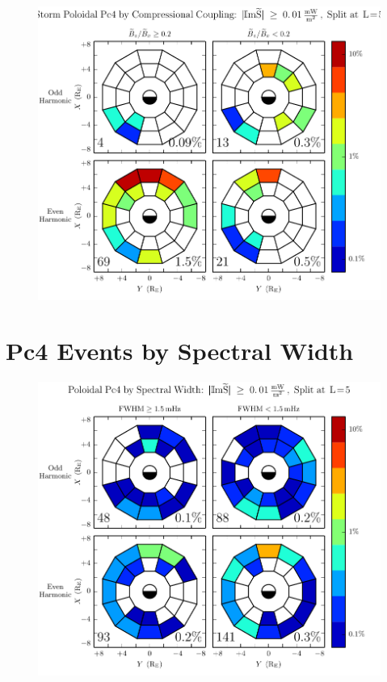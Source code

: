 \begin{figure}[!htb]
    \centering
    \includegraphics[width=\textwidth]{figures/azm_rate_storm.pdf}
    \caption[Poloidal Pc4 Rate by Compressional Coupling: Dst$< \SI{-30}{\nT}$]{
      \todo{$\cdots$}
    }
    \label{fig_azm_rate_storm}
\end{figure}



\section{Pc4 Events by Spectral Width}


\begin{figure}[!htb]
    \centering
    \includegraphics[width=\textwidth]{figures/fwhm_rate_p_all.pdf}
    \caption[Poloidal Pc4 Rate by Compressional Coupling]{
      \todo{$\cdots$}
    }
    \label{fig_fwhm_rate_p_all}
\end{figure}

